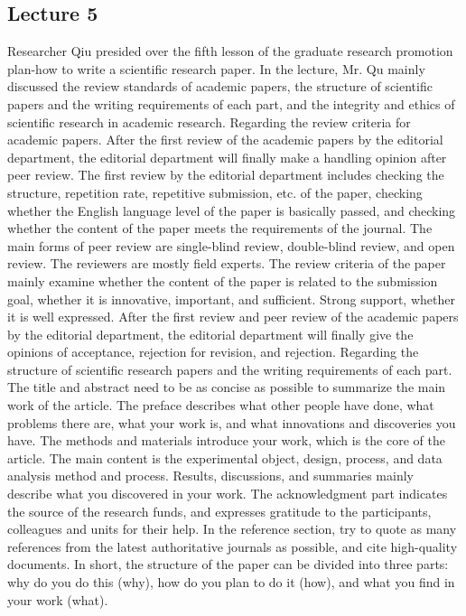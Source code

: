 \documentclass[UTF-8]{ctexart}
\begin{document}
\subsection{Lecture 5} 
Researcher Qiu presided over the fifth lesson of the graduate research promotion plan-how to write a scientific research paper. In the lecture, Mr. Qu mainly discussed the review standards of academic papers, the structure of scientific papers and the writing requirements of each part, and the integrity and ethics of scientific research in academic research.
Regarding the review criteria for academic papers. After the first review of the academic papers by the editorial department, the editorial department will finally make a handling opinion after peer review. The first review by the editorial department includes checking the structure, repetition rate, repetitive submission, etc. of the paper, checking whether the English language level of the paper is basically passed, and checking whether the content of the paper meets the requirements of the journal. The main forms of peer review are single-blind review, double-blind review, and open review. The reviewers are mostly field experts. The review criteria of the paper mainly examine whether the content of the paper is related to the submission goal, whether it is innovative, important, and sufficient. Strong support, whether it is well expressed. After the first review and peer review of the academic papers by the editorial department, the editorial department will finally give the opinions of acceptance, rejection for revision, and rejection.
Regarding the structure of scientific research papers and the writing requirements of each part. The title and abstract need to be as concise as possible to summarize the main work of the article. The preface describes what other people have done, what problems there are, what your work is, and what innovations and discoveries you have. The methods and materials introduce your work, which is the core of the article. The main content is the experimental object, design, process, and data analysis method and process. Results, discussions, and summaries mainly describe what you discovered in your work. The acknowledgment part indicates the source of the research funds, and expresses gratitude to the participants, colleagues and units for their help. In the reference section, try to quote as many references from the latest authoritative journals as possible, and cite high-quality documents. In short, the structure of the paper can be divided into three parts: why do you do this (why), how do you plan to do it (how), and what you find in your work (what).
\end{document}
